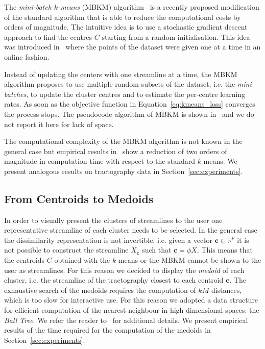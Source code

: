 The \emph{mini-batch $k$-means} (MBKM) algorithm~\cite{sculley2010web}
is a recently proposed modification of the standard algorithm that is
able to reduce the computational costs by orders of magnitude. The
intuitive idea is to use a stochastic gradient descent approach to
find the centres $C$ starting from a random initialisation. This idea
was introduced in~\cite{bottou1995convergence} where the points of the
dataset were given one at a time in an online fashion.

Instead of updating the centers with one streamline at a time, the
MBKM algorithm proposes to use multiple random subsets of the dataset,
i.e. the \emph{mini batches}, to update the cluster centres and to
estimate the per-centre learning rates. As soon as the objective
function in Equation~\ref{eq:kmeans_loss} converges the process
stops. The pseudocode algorithm of MBKM is shown
in~\cite{sculley2010web} and we do not report it here for lack of
space.

The computational complexity of the MBKM algorithm is not known in the
general case but empirical results in~\cite{sculley2010web} show a
reduction of two orders of magnitude in computation time with respect
to the standard $k$-means. We present analogous results on
tractography data in Section~\ref{sec:experiments}.



\subsection{From Centroids to Medoids}
\label{sec:trees}
In order to visually present the clusters of streamlines to the user
one representative streamline of each cluster needs to be selected. In
the general case the dissimilarity representation is not invertible,
i.e. given a vector $\mathbf{c} \in \mathbb{R}^p$ it is not possible
to construct the streamline $X_{\mathbf{c}}$ such that $\mathbf{c} =
\phi{X}$. This means that the centroids $C$ obtained with the
$k$-means or the MBKM cannot be shown to the user as streamlines. For
this reason we decided to display the \emph{medoid} of each cluster,
i.e. the streamline of the tractography closest to each centroid
$\mathbf{c}$. The exhaustive search of the medoids requires the
computation of $kM$ distances, which is too slow for interactive
use. For this reason we adopted a data structure for efficient
computation of the nearest neighbour in high-dimensional spaces: the
\emph{Ball Tree}. We refer the reader to~\cite{omohundro1989balltree}
for additional details. We present empirical results of the time
required for the computation of the medoids in
Section~\ref{sec:experiments}.


